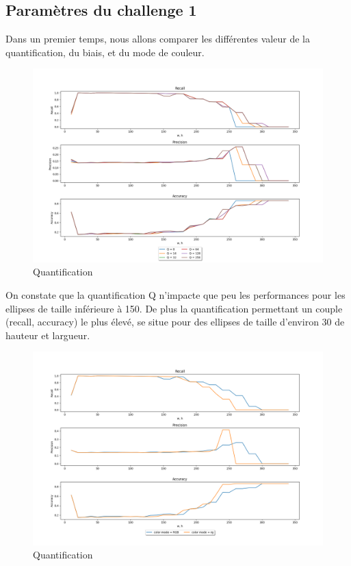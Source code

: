 \documentclass[a4paper,12pt, openany]{book}
\theoremstyle{break}
\begin{document}
\subsection{Paramètres du challenge 1}
Dans un premier temps, nous allons comparer les différentes valeur de la quantification, du biais, et du mode de couleur.

\begin{figure}[H]
  \includegraphics[width=\textwidth]{images/compare_quantification}
  \caption{Quantification}
  \label{fig:quant}
\end{figure}

On constate que la quantification Q n'impacte que peu les performances pour les ellipses de taille inférieure à 150. De plus la quantification permettant un couple (recall, accuracy) le plus élevé, se situe pour des ellipses de taille d'environ 30 de hauteur et largueur.

\begin{figure}[H]
  \includegraphics[width=\textwidth]{images/compare_color_mode}
  \caption{Quantification}
  \label{fig:colmode}
\end{figure}
\end{document}
